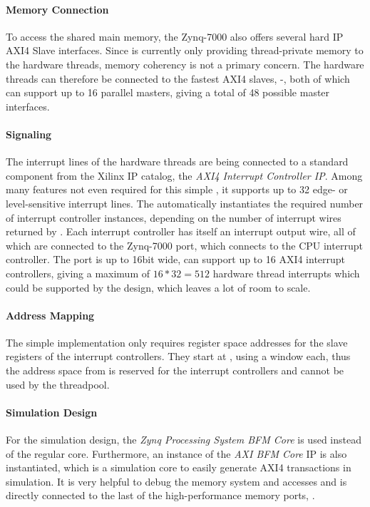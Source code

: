 \paragraph{Memory Connection}
To access the shared main memory, the Zynq-7000 also offers several hard IP AXI4 Slave interfaces.
Since \tapasco{} is currently only providing thread-private memory to the hardware threads, memory coherency is not a primary concern.
The hardware threads can therefore be connected to the fastest AXI4 slaves, -, both of which can support up to 16 parallel masters, giving a total of 48 possible master interfaces.

\paragraph{Signaling}
The interrupt lines of the hardware threads are being connected to a standard component from the Xilinx IP catalog, the \emph{AXI4 Interrupt Controller IP}.
Among many features not even required for this simple , it supports up to 32 edge- or level-sensitive interrupt lines.
The  automatically instantiates the required number of interrupt controller instances, depending on the number of interrupt wires returned by .
Each interrupt controller has itself an interrupt output wire, all of which are connected to the Zynq-7000  port, which connects to the CPU interrupt controller.
The  port is up to 16bit wide, can support up to 16 AXI4 interrupt controllers, giving a maximum of $16 * 32 = 512$ hardware thread interrupts which could be supported by the design, which leaves a lot of room to scale.

\paragraph{Address Mapping}
The simple  implementation only requires register space addresses for the slave registers of the interrupt controllers.
They start at , using a  window each, thus the address space from  is reserved for the interrupt controllers and cannot be used by the threadpool.

\paragraph{Simulation Design}
For the simulation design, the \emph{Zynq Processing System BFM Core} is used instead of the regular core.
Furthermore, an instance of the \emph{AXI BFM Core} IP is also instantiated, which is a simulation core to easily generate AXI4 transactions in simulation.
It is very helpful to debug the memory system and accesses and is directly connected to the last of the high-performance memory ports, .

